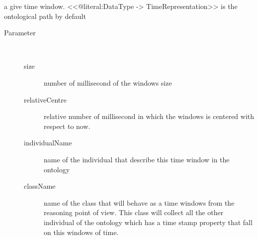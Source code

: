 \begin{description}
 a give time window. <<@literal:DataType -> TimeRepresentation>> is
 the ontological path by default
\begin{description}
\item[Parameter] ~
\begin{description}
\item[size]
number of millisecond of the windows size
\item[relativeCentre]
relative number of millisecond in which the windows is
 centered with respect to now.
\item[individualName]
name of the individual that describe this time window in the 
 ontology
\item[className]
name of the class that will behave as
 a time windows from the reasoning point of view. This class will
 collect all the other individual of the ontology which has a time stamp
 property that fall on this windows of time.
\end{description}
\end{description}
\end{description}
